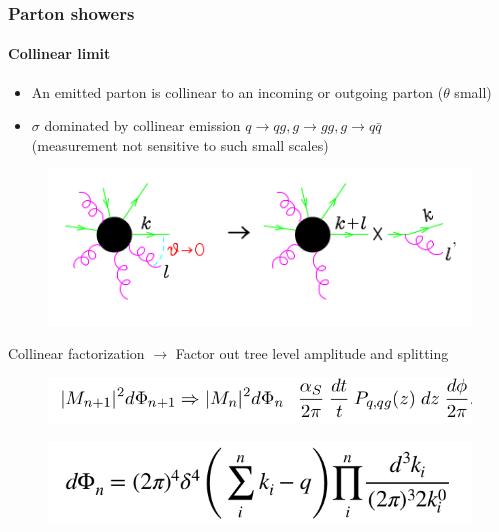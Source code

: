 \documentclass[aspectratio=43]{beamer}
\begin{document}
\begin{frame}

	\frametitle{Parton showers}
	\framesubtitle{Collinear limit}
	
	\begin{itemize} 
		\item \footnotesize An emitted parton is collinear to an incoming or outgoing parton ($\theta$ small)
		\item \footnotesize $\sigma$ dominated by collinear emission $q \rightarrow qg, g \rightarrow gg, g \rightarrow q\bar{q}$ \\
		(measurement not sensitive to such small scales)
	\end{itemize}
	
	\begin{figure}
		\includegraphics[width = 6.5 cm]{plots/collinear_factorization.png}
	\end{figure}
	
	\footnotesize Collinear factorization $\longrightarrow$ Factor out tree level amplitude and splitting
	\begin{figure}
		\includegraphics[width = 7 cm]{plots/eq_factorization_theorem.png}
	\end{figure}

	\begin{figure}
		\includegraphics[width = 5 cm]{plots/eq_factorization_ps.png}
	\end{figure}

\end{frame}
\end{document}
